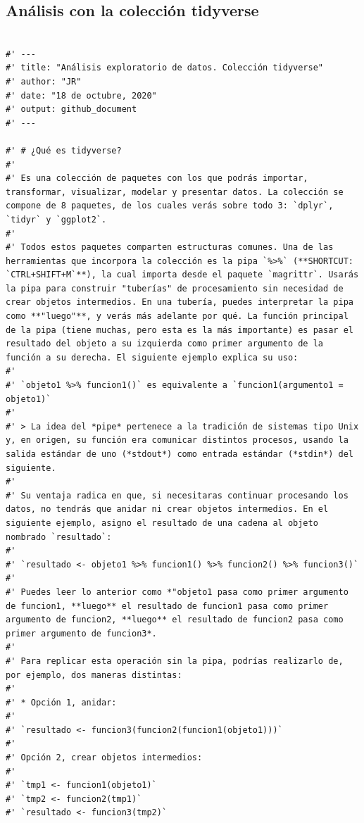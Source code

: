 \documentclass[11pt,]{article}
\begin{document}
\subsection{Análisis con la colección
tidyverse}\label{anuxe1lisis-con-la-colecciuxf3n-tidyverse}

\begin{verbatim}

#' ---
#' title: "Análisis exploratorio de datos. Colección tidyverse"
#' author: "JR"
#' date: "18 de octubre, 2020"
#' output: github_document
#' ---

#' # ¿Qué es tidyverse?
#' 
#' Es una colección de paquetes con los que podrás importar, transformar, visualizar, modelar y presentar datos. La colección se compone de 8 paquetes, de los cuales verás sobre todo 3: `dplyr`, `tidyr` y `ggplot2`.
#' 
#' Todos estos paquetes comparten estructuras comunes. Una de las herramientas que incorpora la colección es la pipa `%>%` (**SHORTCUT: `CTRL+SHIFT+M`**), la cual importa desde el paquete `magrittr`. Usarás la pipa para construir "tuberías" de procesamiento sin necesidad de crear objetos intermedios. En una tubería, puedes interpretar la pipa como **"luego"**, y verás más adelante por qué. La función principal de la pipa (tiene muchas, pero esta es la más importante) es pasar el resultado del objeto a su izquierda como primer argumento de la función a su derecha. El siguiente ejemplo explica su uso:
#' 
#' `objeto1 %>% funcion1()` es equivalente a `funcion1(argumento1 = objeto1)`
#' 
#' > La idea del *pipe* pertenece a la tradición de sistemas tipo Unix y, en origen, su función era comunicar distintos procesos, usando la salida estándar de uno (*stdout*) como entrada estándar (*stdin*) del siguiente.
#' 
#' Su ventaja radica en que, si necesitaras continuar procesando los datos, no tendrás que anidar ni crear objetos intermedios. En el siguiente ejemplo, asigno el resultado de una cadena al objeto nombrado `resultado`:
#' 
#' `resultado <- objeto1 %>% funcion1() %>% funcion2() %>% funcion3()`
#' 
#' Puedes leer lo anterior como *"objeto1 pasa como primer argumento de funcion1, **luego** el resultado de funcion1 pasa como primer argumento de funcion2, **luego** el resultado de funcion2 pasa como primer argumento de funcion3*.
#' 
#' Para replicar esta operación sin la pipa, podrías realizarlo de, por ejemplo, dos maneras distintas:
#' 
#' * Opción 1, anidar:
#' 
#' `resultado <- funcion3(funcion2(funcion1(objeto1)))`
#' 
#' Opción 2, crear objetos intermedios:
#' 
#' `tmp1 <- funcion1(objeto1)`
#' `tmp2 <- funcion2(tmp1)`
#' `resultado <- funcion3(tmp2)`

\end{verbatim}
\end{document}
